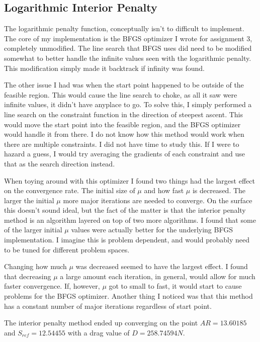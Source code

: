 \documentclass[12pt,parskip=full]{article}
\numberwithin{subsection}{section}
\begin{document}
		\subsection{Logarithmic Interior Penalty}
			The logarithmic penalty function, conceptually isn't to difficult to implement. The core of my implementation
			is the BFGS optimizer I wrote for assignment 3, completely unmodified. The line search that BFGS uses did
			need to be modified somewhat to better handle the infinite values seen with the logarithmic penalty. This
			modification simply made it backtrack if infinity was found.
			
			The other issue I had was when the start point happened to be outside of the feasible region. This would
			cause the line search to choke, as all it saw were infinite values, it didn't have anyplace to go. To
			solve this, I simply performed a line search on the constraint function in the direction of steepest ascent.
			This would move the start point into the feasible region, and the BFGS optimizer would handle it from there.
			I do not know how this method would work when there are multiple constraints. I did not have time to study
			this. If I were to hazard a guess, I would try averaging the gradients of each constraint and use that as
			the search direction instead.
			
			When toying around with this optimizer I found two things had the largest effect on the convergence rate.
			The initial size of $\mu$ and how fast $\mu$ is decreased. The larger the initial $\mu$ more major
			iterations are needed to converge. On the surface this doesn't sound ideal, but the fact of the matter is
			that the interior penalty method is an algorithm layered on top of two more algorithms. I found that some
			of the larger initial $\mu$ values were actually better for the underlying BFGS implementation. I imagine
			this is problem dependent, and would probably need to be tuned for different problem spaces.
			
			Changing how much $\mu$ was decreased seemed to have the largest effect. I found that decreasing $\mu$
			a large amount each iteration, in general, would allow for much faster convergence. If, however, $\mu$
			got to small to fast, it would start to cause problems for the BFGS optimizer. Another thing I noticed
			was that this method has a constant number of major iterations regardless of start point.
			
			The interior penalty method ended up converging on the point $AR = 13.60185$ and $S_{ref} = 12.54455$
			with a drag value of $D = 258.74594N$.
		
\end{document}
